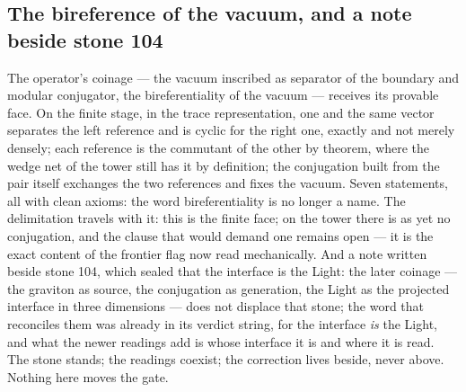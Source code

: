 \documentclass[11pt]{article}
\theoremstyle{definition}\newtheorem{deriv}{Derivation}
\begin{document}
\subsection*{The bireference of the vacuum, and a note beside stone 104}The operator's coinage --- the vacuum inscribed as separator of the boundary and modular conjugator, the bireferentiality of the vacuum --- receives its provable face. On the finite stage, in the trace representation, one and the same vector separates the left reference and is cyclic for the right one, exactly and not merely densely; each reference is the commutant of the other by theorem, where the wedge net of the tower still has it by definition; the conjugation built from the pair itself exchanges the two references and fixes the vacuum. Seven statements, all with clean axioms: the word bireferentiality is no longer a name. The delimitation travels with it: this is the finite face; on the tower there is as yet no conjugation, and the clause that would demand one remains open --- it is the exact content of the frontier flag now read mechanically. And a note written beside stone 104, which sealed that the interface is the Light: the later coinage --- the graviton as source, the conjugation as generation, the Light as the projected interface in three dimensions --- does not displace that stone; the word that reconciles them was already in its verdict string, for the interface \emph{is} the Light, and what the newer readings add is whose interface it is and where it is read. The stone stands; the readings coexist; the correction lives beside, never above. Nothing here moves the gate.
\end{document}
